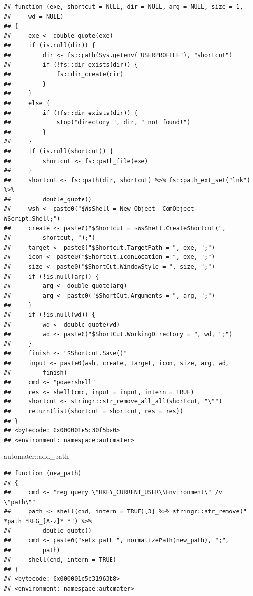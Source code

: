 \documentclass[
]{article}
\newenvironment{Shaded}{\begin{snugshade}}{\end{snugshade}}
\newcommand{\NormalTok}[1]{#1}
\newcommand{\SpecialCharTok}[1]{\textcolor[rgb]{0.00,0.00,0.00}{#1}}
\begin{document}
\begin{verbatim}
## function (exe, shortcut = NULL, dir = NULL, arg = NULL, size = 1, 
##     wd = NULL) 
## {
##     exe <- double_quote(exe)
##     if (is.null(dir)) {
##         dir <- fs::path(Sys.getenv("USERPROFILE"), "shortcut")
##         if (!fs::dir_exists(dir)) {
##             fs::dir_create(dir)
##         }
##     }
##     else {
##         if (!fs::dir_exists(dir)) {
##             stop("directory ", dir, " not found!")
##         }
##     }
##     if (is.null(shortcut)) {
##         shortcut <- fs::path_file(exe)
##     }
##     shortcut <- fs::path(dir, shortcut) %>% fs::path_ext_set("lnk") %>% 
##         double_quote()
##     wsh <- paste0("$WsShell = New-Object -ComObject WScript.Shell;")
##     create <- paste0("$Shortcut = $WsShell.CreateShortcut(", 
##         shortcut, ");")
##     target <- paste0("$Shortcut.TargetPath = ", exe, ";")
##     icon <- paste0("$Shortcut.IconLocation = ", exe, ";")
##     size <- paste0("$ShortCut.WindowStyle = ", size, ";")
##     if (!is.null(arg)) {
##         arg <- double_quote(arg)
##         arg <- paste0("$ShortCut.Arguments = ", arg, ";")
##     }
##     if (!is.null(wd)) {
##         wd <- double_quote(wd)
##         wd <- paste0("$ShortCut.WorkingDirectory = ", wd, ";")
##     }
##     finish <- "$Shortcut.Save()"
##     input <- paste0(wsh, create, target, icon, size, arg, wd, 
##         finish)
##     cmd <- "powershell"
##     res <- shell(cmd, input = input, intern = TRUE)
##     shortcut <- stringr::str_remove_all_all(shortcut, "\"")
##     return(list(shortcut = shortcut, res = res))
## }
## <bytecode: 0x000001e5c30f5ba0>
## <environment: namespace:automater>
\end{verbatim}

\begin{Shaded}
\begin{Highlighting}[]
\NormalTok{automater}\SpecialCharTok{::}\NormalTok{add\_path}
\end{Highlighting}
\end{Shaded}

\begin{verbatim}
## function (new_path) 
## {
##     cmd <- "reg query \"HKEY_CURRENT_USER\\Environment\" /v \"path\""
##     path <- shell(cmd, intern = TRUE)[3] %>% stringr::str_remove(" *path *REG_[A-z]* *") %>% 
##         double_quote()
##     cmd <- paste0("setx path ", normalizePath(new_path), ";", 
##         path)
##     shell(cmd, intern = TRUE)
## }
## <bytecode: 0x000001e5c31963b8>
## <environment: namespace:automater>
\end{verbatim}
\end{document}
